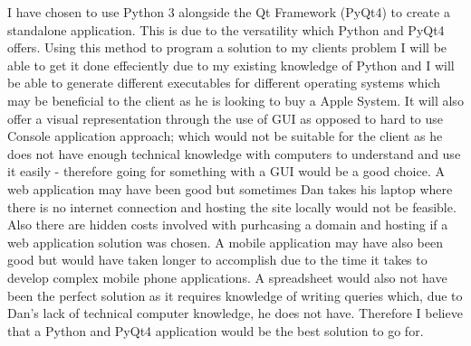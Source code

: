 \begin{flushleft}
	I have chosen to use Python 3 alongside the Qt Framework (PyQt4) to create a standalone application. This is due to the versatility which Python and PyQt4 offers. Using this method to program a solution to my clients problem I will be able to get it done effeciently due to my existing knowledge of Python and I will be able to generate different executables for different operating systems which may be beneficial to the client as he is looking to buy a Apple System. It will also offer a visual representation through the use of GUI as opposed to hard to use Console application approach; which would not be suitable for the client as he does not have enough technical knowledge with computers to understand and use it easily - therefore going for something with a GUI would be a good choice. A web application may have been good but sometimes Dan takes his laptop where there is no internet connection and hosting the site locally would not be feasible. Also there are hidden costs involved with purhcasing a domain and hosting if a web application solution was chosen. A mobile application may have also been good but would have taken longer to accomplish due to the time it takes to develop complex mobile phone applications. A spreadsheet would also not have been the perfect solution as it requires knowledge of writing queries which, due to Dan's lack of technical computer knowledge, he does not have. Therefore I believe that a Python and PyQt4 application would be the best solution to go for.

\end{flushleft}
